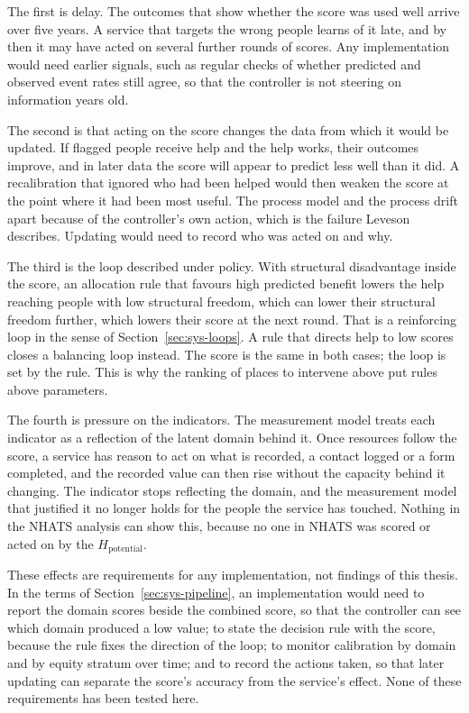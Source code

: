 The first is delay. The outcomes that show whether the score was used well arrive
over five years. A service that targets the wrong people learns of it late, and by
then it may have acted on several further rounds of scores. Any implementation
would need earlier signals, such as regular checks of whether predicted and
observed event rates still agree, so that the controller is not steering on
information years old.

The second is that acting on the score changes the data from which it would be
updated. If flagged people receive help and the help works, their outcomes improve,
and in later data the score will appear to predict less well than it did. A
recalibration that ignored who had been helped would then weaken the score at the
point where it had been most useful. The process model and the process drift apart
because of the controller's own action, which is the failure Leveson describes.
Updating would need to record who was acted on and why.

The third is the loop described under policy. With structural disadvantage inside
the score, an allocation rule that favours high predicted benefit lowers the help
reaching people with low structural freedom, which can lower their structural
freedom further, which lowers their score at the next round. That is a reinforcing
loop in the sense of Section~\ref{sec:sys-loops}. A rule that directs help to low
scores closes a balancing loop instead. The score is the same in both cases; the
loop is set by the rule. This is why the ranking of places to intervene above put
rules above parameters.

The fourth is pressure on the indicators. The measurement model treats each
indicator as a reflection of the latent domain behind it. Once resources follow the
score, a service has reason to act on what is recorded, a contact logged or a form
completed, and the recorded value can then rise without the capacity behind it
changing. The indicator stops reflecting the domain, and the measurement model that
justified it no longer holds for the people the service has touched. Nothing in the
NHATS analysis can show this, because no one in NHATS was scored or acted on by the
$H_{\text{potential}}$.

These effects are requirements for any implementation, not findings of this thesis.
In the terms of Section~\ref{sec:sys-pipeline}, an implementation would need to
report the domain scores beside the combined score, so that the controller can see
which domain produced a low value; to state the decision rule with the score,
because the rule fixes the direction of the loop; to monitor calibration by domain
and by equity stratum over time; and to record the actions taken, so that later
updating can separate the score's accuracy from the service's effect. None of these
requirements has been tested here.


